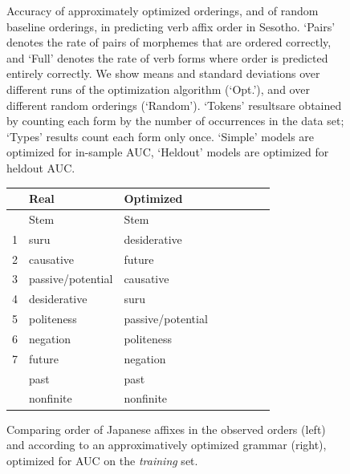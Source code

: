 \documentclass[11pt,letterpaper]{article}
\begin{document}
\begin{figure}
\begin{tabular}{cccc||ll|ll}
\end{tabular}
\caption{Accuracy of approximately optimized orderings, and of random baseline orderings, in predicting verb affix order in Sesotho. `Pairs' denotes the rate of pairs of morphemes that are ordered correctly, and `Full' denotes the rate of verb forms where order is predicted entirely correctly. We show means and standard deviations over different runs of the optimization algorithm (`Opt.'), and over different random orderings (`Random'). `Tokens' resultsare obtained by counting each form by the number of occurrences in the data set; `Types' results count each form only once. `Simple' models are optimized for in-sample AUC, `Heldout' models are optimized for heldout AUC.}\label{fig:acc-sesotho}
\end{figure}



\begin{figure}
    \centering
    \begin{tabular}{llllllll}
            &       Real & Optimized \\ \hline\hline
            &    Stem & Stem \\ \hline
	    1&suru & desiderative \\
	    2&causative & future \\
	    3&passive/potential & causative \\
	    4&desiderative & suru \\
	    5&politeness & passive/potential \\
	    6&negation & politeness \\
	    7&future & negation \\
	    &past & past \\
	    &nonfinite & nonfinite \\ \hline
    \end{tabular}
	\caption{Comparing order of Japanese affixes in the observed orders (left) and according to an approximatively optimized grammar (right), optimized for AUC on the \emph{training} set.}
    \label{fig:grammar-table-jap}
\end{figure}
\end{document}
